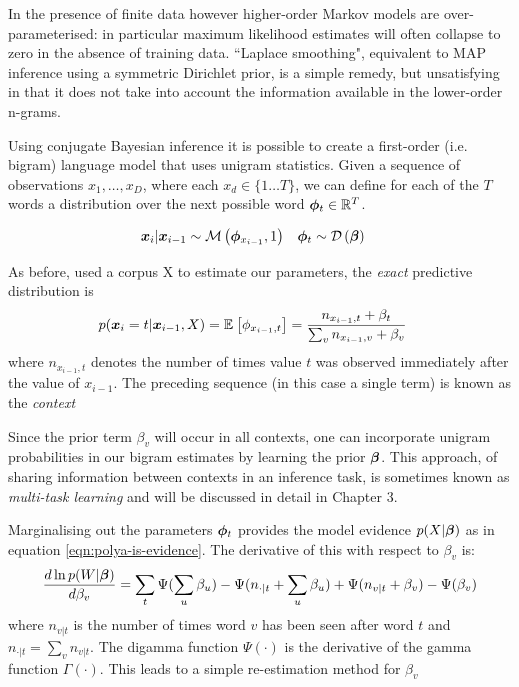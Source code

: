 In the presence of finite data however higher-order Markov models are over-parameterised: in particular maximum likelihood estimates will often collapse to zero in the absence of training data. ``Laplace smoothing", equivalent to MAP inference using a symmetric Dirichlet prior, is a simple remedy, but unsatisfying in that it does not take into account the information available in the lower-order n-grams.

Using conjugate Bayesian inference it is possible to create a first-order (i.e. bigram) language model\cite{MacKay1995} that uses unigram statistics. Given a sequence of observations $x_1, \ldots, x_D$, where each $x_d \in \{1 \ldots T\}$, we can define for each of the $T$ words a distribution over the next possible word $\bm \phi_t \in { \mathbb{R}^{T} }$.

\begin{align}
\bm x_i | \bm x_{i - 1} 
& \sim \mathcal{M} \left( {\bm \phi_{x_{i-1}}},{1} \right)
& \bm \phi_t 
& \sim \mathcal{D} \left( {\bm \beta} \right)
\end{align}

As before, used a corpus X to estimate our parameters, the \emph{exact} predictive distribution is
\begin{align}
p(\bm x_i = t | \bm x_{i-1}, X)
& = \mathbb{E}_{ {  } }\left[ \phi_{x_{i-1},t} \right]
  = \frac{n_{x_{i-1},t} + \beta_t}{\sum_v n_{x_{i-1},v} + \beta_v}
\end{align}
where $n_{x_{i-1},t}$ denotes the number of times value $t$ was observed immediately after the value of $x_{i-1}$. The preceding sequence (in this case a single term) is known as the \emph{context}

Since the prior term $\beta_v$ will occur in all contexts, one can incorporate unigram probabilities in our bigram estimates by learning the prior $\bm \beta$. This approach, of sharing information between contexts in an inference task, is sometimes known as \emph{multi-task learning} and will be discussed in detail in Chapter 3.

Marginalising out the parameters $\bm \phi_t$ provides the model evidence $p(X|\bm \beta)$ as in equation \eqref{eqn:polya-is-evidence}. The derivative of this with respect to $\beta_v$ is:
\begin{align}
\frac{d \ln p(W|\bm \beta)}{d\beta_v} =
\sum_t
     \Psi(\sum_u \beta_u) 
     - \Psi(n_{\cdot|t} + \sum_u \beta_u)
     + \Psi(n_{v|t} + \beta_v)
     - \Psi(\beta_v)
\end{align}
where $n_{v|t}$ is the number of times word $v$ has been seen after word $t$ and $n_{\cdot|t} = \sum_v n_{v|t}$. The digamma function $\Psi(\cdot)$ is the derivative of the gamma function $\Gamma(\cdot)$. This leads to a simple re-estimation method for $\beta_v$

